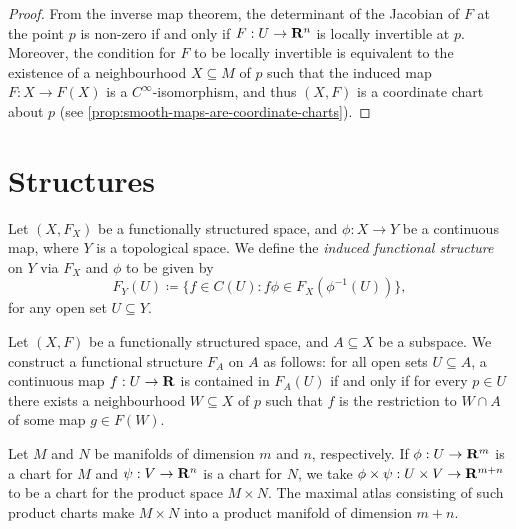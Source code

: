 \begin{proof}
    From the inverse map theorem, the determinant of the Jacobian of \(F\) at the
    point \(p\) is non-zero if and only if \(F: U \to \mathbf{R}^n\) is locally invertible
    at \(p\). Moreover, the condition for \(F\) to be locally invertible is
    equivalent to the existence of a neighbourhood \(X \subseteq M\) of \(p\) such
    that the induced map \(F: X \to F(X)\) is a \(C^{\infty}\)-isomorphism, and thus
    \((X, F)\) is a coordinate chart about \(p\) (see
    \cref{prop:smooth-maps-are-coordinate-charts}).
\end{proof}

\section{Structures}

\begin{definition}
    \label{def:induced-functional-structure-space}
    Let \((X, F_X)\) be a functionally structured space, and \(\phi: X \to Y\) be a
    continuous map, where \(Y\) is a topological space. We define the \emph{induced
        functional structure} on \(Y\) via \(F_X\) and \(\phi\) to be given by
    \[
        F_Y(U) \coloneq \{f \in C(U) \colon f \phi \in F_X(\phi^{-1}(U))\},
    \]
    for any open set \(U \subseteq Y\).
\end{definition}

\begin{definition}
    \label{def:induced-func-struc-on-subspace}
    Let \((X, F)\) be a functionally structured space, and \(A \subseteq X\) be a
    subspace. We construct a functional structure \(F_A\) on \(A\) as follows: for
    all open sets \(U \subseteq A\), a continuous map \(f: U \to \mathbf{R}\) is contained
    in \(F_A(U)\) if and only if for every \(p \in U\) there exists a neighbourhood
    \(W \subseteq X\) of \(p\) such that \(f\) is the restriction to \(W \cap A\) of
    some map \(g \in F(W)\).
\end{definition}

\begin{definition}
    \label{def:product-manifold}
    Let \(M\) and \(N\) be manifolds of dimension \(m\) and \(n\), respectively. If
    \(\phi: U \to \mathbf{R}^m\) is a chart for \(M\) and \(\psi: V \to \mathbf{R}^n\) is a chart
    for \(N\), we take \(\phi \times \psi: U \times V \to \mathbf{R}^{m + n}\) to be a chart
    for the product space \(M \times N\). The maximal atlas consisting of such
    product charts make \(M \times N\) into a product manifold of dimension
    \(m + n\).
\end{definition}

